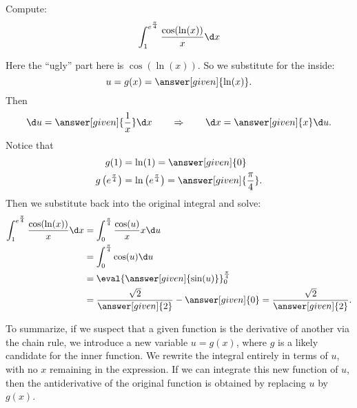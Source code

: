 \documentclass{ximera}
\begin{document}
\begin{example}
  Compute:
  \[
  \int_{1}^{e^{\frac{\pi}{4}}} \frac{\cos(\ln(x))}{x} \d x
  \]
\begin{explanation}
Here the ``ugly'' part here is $\cos(\ln(x))$.  So we substitute for
the inside:
\[
u=g(x)=\answer[given]{\ln(x)}.
\]
Then
\[
\d u =  \answer[given]{\frac{1}{x}} \d x 	\qquad	\Rightarrow	\qquad	\d x = \answer[given]{x} \d u.
\]
Notice that
\begin{align*}
g(1) &= \ln (1) = \answer[given]{0} \\
g \left( e^{\frac{\pi}{4}} \right) &= \ln \left( e^{\frac{\pi}{4}} \right) = \answer[given]{\frac{\pi}{4}}.
\end{align*}
Then we substitute back into the original integral and solve:
\begin{align*}
\int_{1}^{e^{\frac{\pi}{4}}} \frac{\cos(\ln(x))}{x} \d x &= \int_0^{\frac{\pi}{4}} \frac{\cos(u)}{x} x \d u  \\
&= \int_0^{\frac{\pi}{4}} \cos(u) \d u  \\
&= \eval{\answer[given]{\sin(u)}}_{0}^{\frac{\pi}{4}}  \\
&= \frac{\sqrt{2}}{\answer[given]{2}} - \answer[given]{0} = \frac{\sqrt{2}}{\answer[given]{2}}.
\end{align*}
\end{explanation}
\end{example}

To summarize, if we suspect that a given function is the derivative of
another via the chain rule, we introduce a new variable $u=g(x)$, where $g$ is a likely candidate for
the inner function. We rewrite the integral
 entirely in terms of $u$, with no $x$ remaining in the
expression. If we can integrate this new function of $u$, then the
antiderivative of the original function is obtained by replacing $u$
by $g(x)$.
\end{document}

